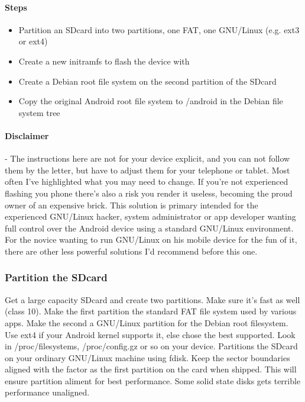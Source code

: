 \paragraph{Steps}

\begin{itemize}
  \item 
Partition an SDcard into two partitions, one FAT, one GNU/Linux (e.g. ext3 or ext4)
  \item 
Create a new initramfs to flash the device with
  \item 
Create a Debian root file system on the second partition of the SDcard
  \item 
Copy the original Android root file system to /android in the Debian file system tree
\end{itemize}

\paragraph{Disclaimer} - The instructions here are not for your device explicit,
and you can not follow them by the letter, but have to adjust them for your
telephone or tablet. Most often I've highlighted what you may need to change. If
you're not experienced flashing you phone there's also a risk you render it
useless, becoming the proud owner of an expensive brick. This solution is
primary intended for the experienced GNU/Linux hacker, system administrator or
app developer wanting full control over the Android device using a standard
GNU/Linux environment. For the novice wanting to run GNU/Linux on his mobile
device for the fun of it, there are other less powerful solutions I'd recommend
before this one.

\subsubsection{Partition the SDcard}

Get a large capacity SDcard and create two partitions. Make sure it's fast as
well (class 10). Make the first partition the standard FAT file system used by
various apps. Make the second a GNU/Linux partition for the Debian root
filesystem. Use ext4 if your Android kernel supports it, else chose the best
supported. Look in /proc/filesystems, /proc/config.gz or so on your device.
Partitions the SDcard on your ordinary GNU/Linux machine using fdisk. Keep the
sector boundaries aligned with the factor as the first partition on the card
when shipped. This will ensure partition aliment for best performance. Some
solid state disks gets terrible performance unaligned.

